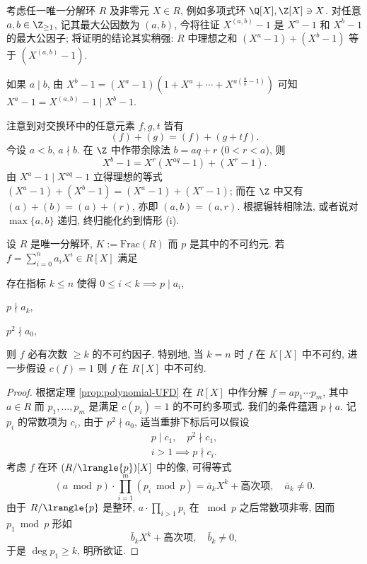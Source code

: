 \begin{example}\label{eg:gcd-cyclotomic}
	考虑任一唯一分解环 $R$ 及非零元 $X \in R$, 例如多项式环 $\Q[X], \Z[X] \ni X$. 对任意 $a, b \in \Z_{\geq 1}$, 记其最大公因数为 $(a,b)$, 今将往证 $X^{(a,b)} - 1$ 是 $X^a - 1$ 和 $X^b - 1$ 的最大公因子; 将证明的结论其实稍强: $R$ 中理想之和 $(X^a - 1) + (X^b - 1)$ 等于 $\left( X^{(a,b)} - 1 \right)$.
	\begin{compactenum}[(i)]
		\item 如果 $a \mid b$, 由 $X^b - 1 = (X^a -1)(1 + X^a + \cdots + X^{a(\frac{b}{a} - 1)})$ 可知 $X^a - 1 = X^{(a,b)} - 1 \mid X^b - 1$.
		\item 注意到对交换环中的任意元素 $f, g, t$ 皆有
			\[ (f) + (g) = (f) + (g+tf). \]
			今设 $a < b$, $a \nmid b$. 在 $\Z$ 中作带余除法 $b = aq + r$ ($0 < r < a$), 则
			\[ X^b - 1 = X^r(X^{aq}-1) + (X^r - 1). \]
			由 $X^a - 1 \mid X^{aq} - 1$ 立得理想的等式 $(X^a - 1) + (X^b - 1) = (X^a - 1) + (X^r - 1)$; 而在 $\Z$ 中又有 $(a) + (b) = (a) + (r)$, 亦即 $(a,b)=(a,r)$. 根据辗转相除法, 或者说对 $\max\{a,b\}$ 递归, 终归能化约到情形 (i).
	\end{compactenum}
\end{example}

\begin{theorem}[Eisenstein 判准]\label{prop:Eisenstein-criterion}
	设 $R$ 是唯一分解环, $K := \mathrm{Frac}(R)$ 而 $p$ 是其中的不可约元. 若 $f = \sum_{i=0}^n a_i X^i \in R[X]$ 满足
	\begin{compactitem}
		\item 存在指标 $k \leq n$ 使得 $0 \leq i < k \implies p \mid a_i$,
		\item $p \nmid a_k$,
		\item $p^2 \nmid a_0$,
	\end{compactitem}
	则 $f$ 必有次数 $\geq k$ 的不可约因子. 特别地, 当 $k=n$ 时 $f$ 在 $K[X]$ 中不可约, 进一步假设 $c(f)=1$ 则 $f$ 在 $R[X]$ 中不可约.
\end{theorem}
\begin{proof}
	根据定理 \ref{prop:polynomial-UFD} 在 $R[X]$ 中作分解 $f = a p_1 \cdots p_m$, 其中 $a \in R$ 而 $p_1, \ldots, p_m$ 是满足 $c(p_i)=1$ 的不可约多项式. 我们的条件蕴涵 $p \nmid a$. 记 $p_i$ 的常数项为 $c_i$, 由于 $p^2 \nmid a_0$, 适当重排下标后可以假设
	\begin{gather*}
		p \mid c_1, \quad p^2 \nmid c_1, \\
		i>1 \implies p \nmid c_i.
	\end{gather*}
	考虑 $f$ 在环 $(R/\lrangle{p})[X]$ 中的像, 可得等式
	\[ (a \bmod p) \cdot \prod_{i=1}^m (p_i \bmod p) = \bar{a}_k X^k + \text{高次项}, \quad \bar{a}_k \neq 0. \]
	由于 $R/\lrangle{p}$ 是整环, $a \cdot \prod_{i > 1} p_i$ 在 $\bmod p$ 之后常数项非零, 因而 $p_1 \bmod p$ 形如
	\[ \bar{b}_k X^k + \text{高次项}, \quad \bar{b}_k \neq 0, \]
	于是 $\deg p_1 \geq k$, 明所欲证.
\end{proof}

